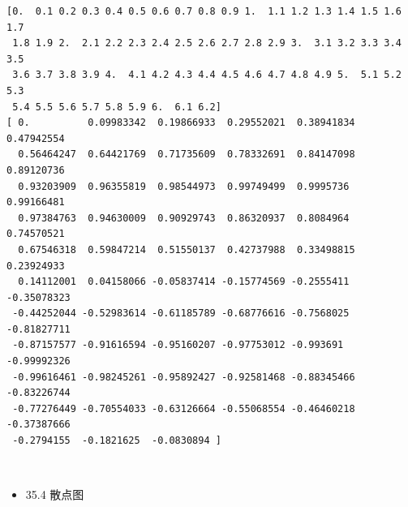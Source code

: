 \documentclass[11pt]{article}
\providecommand{\tightlist}{%
      \setlength{\itemsep}{0pt}\setlength{\parskip}{0pt}}
\begin{document}
    \begin{Verbatim}[commandchars=\\\{\}]
[0.  0.1 0.2 0.3 0.4 0.5 0.6 0.7 0.8 0.9 1.  1.1 1.2 1.3 1.4 1.5 1.6 1.7
 1.8 1.9 2.  2.1 2.2 2.3 2.4 2.5 2.6 2.7 2.8 2.9 3.  3.1 3.2 3.3 3.4 3.5
 3.6 3.7 3.8 3.9 4.  4.1 4.2 4.3 4.4 4.5 4.6 4.7 4.8 4.9 5.  5.1 5.2 5.3
 5.4 5.5 5.6 5.7 5.8 5.9 6.  6.1 6.2]
[ 0.          0.09983342  0.19866933  0.29552021  0.38941834  0.47942554
  0.56464247  0.64421769  0.71735609  0.78332691  0.84147098  0.89120736
  0.93203909  0.96355819  0.98544973  0.99749499  0.9995736   0.99166481
  0.97384763  0.94630009  0.90929743  0.86320937  0.8084964   0.74570521
  0.67546318  0.59847214  0.51550137  0.42737988  0.33498815  0.23924933
  0.14112001  0.04158066 -0.05837414 -0.15774569 -0.2555411  -0.35078323
 -0.44252044 -0.52983614 -0.61185789 -0.68776616 -0.7568025  -0.81827711
 -0.87157577 -0.91616594 -0.95160207 -0.97753012 -0.993691   -0.99992326
 -0.99616461 -0.98245261 -0.95892427 -0.92581468 -0.88345466 -0.83226744
 -0.77276449 -0.70554033 -0.63126664 -0.55068554 -0.46460218 -0.37387666
 -0.2794155  -0.1821625  -0.0830894 ]
    \end{Verbatim}

    \begin{center}
    \end{center}
    { \hspace*{\fill} \\}
    
    \begin{itemize}
\tightlist
\item
  35.4 散点图
\end{itemize}
\end{document}
